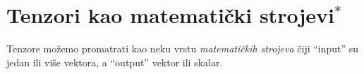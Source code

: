 % 
% 
% 
% 
% 
% 

\section{Tenzori kao matematički strojevi$^{*}$}

Tenzore možemo promatrati kao neku vrstu \emph{matematičkih strojeva}
čiji ``input'' su jedan ili više vektora, a ``output'' vektor ili
skalar. 


